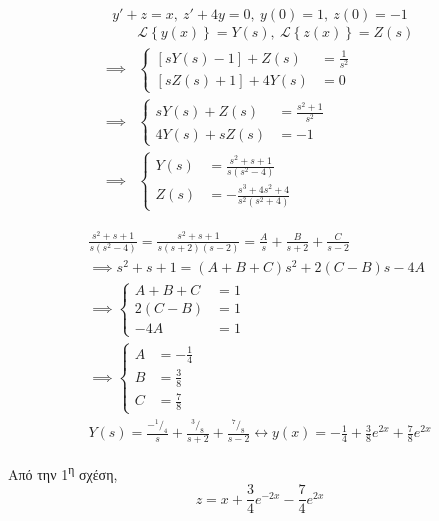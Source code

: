 \documentclass[11pt,a4paper,titlepage,final]{article}
\begin{document}
\begin{exercise*}{12.13}
	\[
	y'+z=x,\ z'+4y=0,\ y(0)=1,\ z(0)=-1
	\]
	\tcblower
	\begin{align*}
	 &\mathscr L \left\lbrace y(x) \right\rbrace = Y(s),\  \mathscr L \left\lbrace z(x) \right\rbrace = Z(s) \\
	 \implies &
	 \begin{cases}
	 \left[sY(s)-1\right]+Z(s) &= \frac{1}{s^2} \\
	 \left[sZ(s)+1\right]+4Y(s) &=0
	 \end{cases}
	 \\ \implies &
	 \begin{cases}
	 sY(s) + Z(s) &= \frac{s^2+1}{s^2} \\
	 4Y(s) + sZ(s) &= -1
	 \end{cases}
	 \\ \implies &
	 \begin{cases}
	 Y(s) &= \frac{s^2+s+1}{s(s^2-4)} \\
	 Z(s) &= -\frac{s^3+4s^2+4}{s^2(s^2+4)}
	 \end{cases}
	\end{align*}

	\begin{align*}
	\frac{s^2+s+1}{s(s^2-4)} = \frac{s^2+s+1}{s(s+2)(s-2)} = \frac{A}{s} + \frac{B}{s+2} + \frac{C}{s-2} \\
	\implies s^2+s+1 = (A+B+C)s^2+2(C-B)s-4A \\
	\implies \begin{cases}
	A+B+C &= 1 \\
	2(C-B) &= 1 \\
	-4A &= 1
	\end{cases} \\
	\implies \begin{cases}
	A &= - \frac{1}{4} \\
	B &= \frac{3}{8} \\
	C &= \frac{7}{8}
	\end{cases} \\
	Y(s) = \frac{- ^1/_4}{s}+\frac{^3/_8}{s+2}+\frac{^7/_8}{s-2} \leftrightarrow \boxed{y(x) = -\frac{1}{4}+\frac{3}{8}e^{2x}+\frac{7}{8}e^{2x}}
	\end{align*}

	Από την 1\textsuperscript{η} σχέση,
	\[
	\boxed{z = x+\frac{3}{4}e^{-2x}-\frac{7}{4}e^{2x}}
	\]
\end{exercise*}
\end{document}
